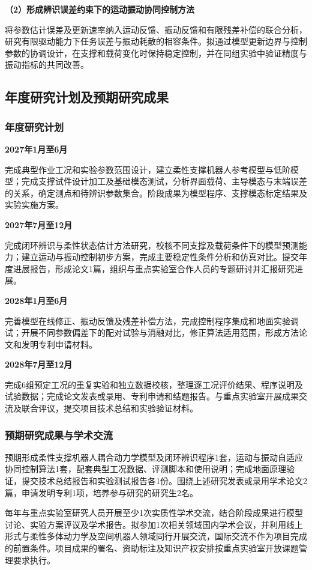 \documentclass[UTF8,a4paper,zihao=-4,fontset=fandol]{ctexart}
\newcommand{\topic}[1]{\par\addvspace{0.5em}\noindent\textbf{#1}\par\nobreak}
\begin{document}
\topic{（2）形成辨识误差约束下的运动振动协同控制方法}

将参数估计误差及更新速率纳入运动反馈、振动反馈和有限残差补偿的联合分析，研究有限驱动能力下任务误差与振动耗散的相容条件。拟通过模型更新边界与控制参数的协调设计，在支撑和载荷变化时保持稳定控制，并在同组实验中验证精度与振动指标的共同改善。

\subsection{年度研究计划及预期研究成果}

\subsubsection{年度研究计划}

\topic{2027年1月至6月}
完成典型作业工况和实验参数范围设计，建立柔性支撑机器人参考模型与低阶模型；完成支撑试件设计加工及基础模态测试，分析界面载荷、主导模态与末端误差的关系，确定测点和待辨识参数集合。阶段成果为模型程序、支撑模态标定结果及实验实施方案。

\topic{2027年7月至12月}
完成闭环辨识与柔性状态估计方法研究，校核不同支撑及载荷条件下的模型预测能力；建立运动与振动控制初步方案，完成主要稳定性条件分析和仿真对比。提交年度进展报告，形成论文1篇，组织与重点实验室合作人员的专题研讨并汇报研究进展。

\topic{2028年1月至6月}
完善模型在线修正、振动反馈及残差补偿方法，完成控制程序集成和地面实验调试；开展不同参数偏差下的配对试验与消融对比，修正算法适用范围，形成方法论文和发明专利申请材料。

\topic{2028年7月至12月}
完成6组预定工况的重复实验和独立数据校核，整理逐工况评价结果、程序说明及试验数据；完成论文发表或录用、专利申请和结题报告。与重点实验室开展成果交流及联合评议，提交项目技术总结和实验验证材料。

\subsubsection{预期研究成果与学术交流}

预期形成柔性支撑机器人耦合动力学模型及闭环辨识程序1套，运动与振动自适应协同控制算法1套，配套典型工况数据、评测脚本和使用说明；完成地面原理验证，提交技术总结报告和实验测试报告各1份。围绕上述研究发表或录用学术论文2篇，申请发明专利1项，培养参与研究的研究生2名。

每年与重点实验室研究人员开展至少1次实质性学术交流，结合阶段成果进行模型讨论、实验方案评议及学术报告。拟参加1次相关领域国内学术会议，并利用线上形式与柔性多体动力学及空间机器人领域同行开展交流，国际交流不作为项目完成的前置条件。项目成果的署名、资助标注及知识产权安排按重点实验室开放课题管理要求执行。
\end{document}
